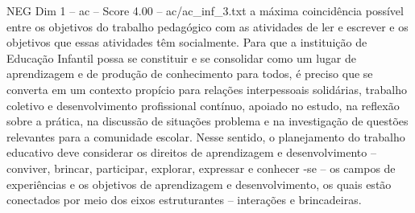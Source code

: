 \begin{textsample}{NEG Dim 1 – ac – Score 4.00 – ac/ac\_inf\_3.txt}
a máxima coincidência possível entre os objetivos do trabalho pedagógico com as atividades de ler e escrever e os objetivos que essas atividades têm socialmente.
Para que a instituição de Educação Infantil possa se constituir e se consolidar como um lugar de aprendizagem e de produção de conhecimento para todos, é preciso que se converta em um contexto propício para relações interpessoais solidárias, trabalho coletivo e desenvolvimento profissional contínuo, apoiado no estudo, na reflexão sobre a prática, na discussão de situações problema e na investigação de questões relevantes para a comunidade escolar.
Nesse sentido, o planejamento do trabalho educativo deve considerar os direitos de aprendizagem e desenvolvimento – conviver, brincar, participar, explorar, expressar e conhecer -se – os campos de experiências e os objetivos de aprendizagem e desenvolvimento, os quais estão conectados por meio dos eixos estruturantes – interações e brincadeiras.

\end{textsample}
